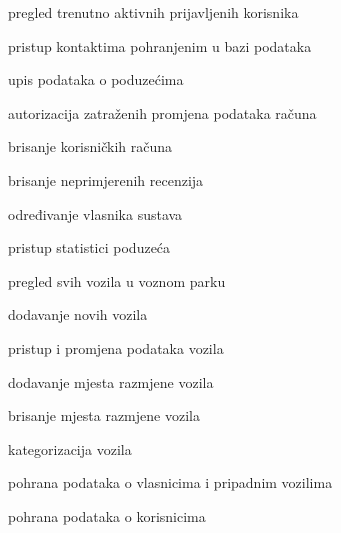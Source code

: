 \begin{packed_enum}
\begin{packed_enum}
				\end{packed_enum}
				
					\item  {}
				
				\begin{packed_enum}
					
					\item pregled trenutno aktivnih prijavljenih korisnika
					\item pristup kontaktima pohranjenim u bazi podataka
					\item upis podataka o poduzećima
					\item autorizacija zatraženih promjena podataka računa
					\item brisanje korisničkih računa
					\item brisanje neprimjerenih recenzija
					\item određivanje vlasnika sustava
					
				\end{packed_enum}
				
					\item  {}
				
				\begin{packed_enum}
					
					\item pristup statistici poduzeća
					\item pregled svih vozila u voznom parku
					\item dodavanje novih vozila
					\item pristup i promjena podataka vozila
					\item dodavanje mjesta razmjene vozila
					\item brisanje mjesta razmjene vozila
					\item kategorizacija vozila
					
				\end{packed_enum}
			
				\item  {}
				
				\begin{packed_enum}
					
					\item pohrana podataka o vlasnicima i pripadnim vozilima
					\item pohrana podataka o korisnicima 
					
				\end{packed_enum}
			\end{packed_enum}
			
